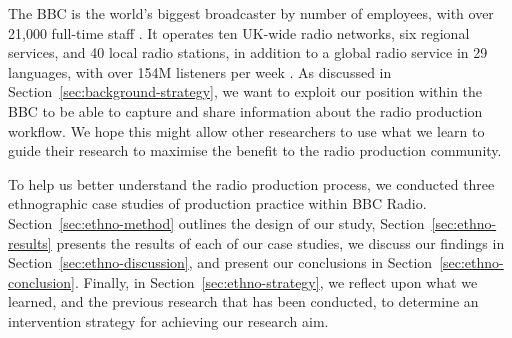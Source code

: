 The BBC is the world's biggest broadcaster by number of employees, with over 21,000 full-time staff
\citep[p.~56]{BBC2017a}. It operates ten UK-wide radio networks, six regional services, and 40 local radio stations, in
addition to a global radio service in 29 languages, with over 154M listeners per week \citep[pp.~4, 32]{BBC2017a}.  As
discussed in Section~\ref{sec:background-strategy}, we want to exploit our position within the BBC to be able to
capture and share information about the radio production workflow. We hope this might allow other researchers to use
what we learn to guide their research to maximise the benefit to the radio production community.



To help us better understand the radio production process, we conducted three ethnographic case studies of production
practice within BBC Radio.  Section~\ref{sec:ethno-method} outlines the design of our study,
Section~\ref{sec:ethno-results} presents the results of each of our case studies, we discuss our findings in
Section~\ref{sec:ethno-discussion}, and present our conclusions in Section~\ref{sec:ethno-conclusion}.  Finally, in
Section~\ref{sec:ethno-strategy}, we reflect upon what we learned, and the previous research that has been conducted,
to determine an intervention strategy for achieving our research aim.



